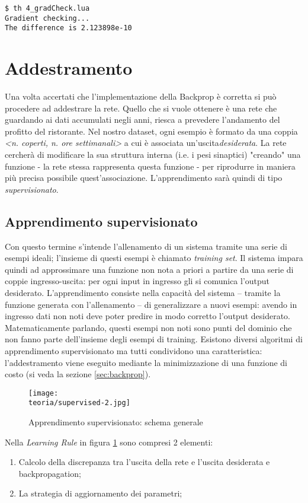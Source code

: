 \begin{lstlisting}
$ th 4_gradCheck.lua 
Gradient checking...	
The difference is 2.123898e-10	
\end{lstlisting}

\section{Addestramento}
\label{ref:training}
Una volta accertati che l'implementazione della Backprop è corretta si può procedere ad addestrare la rete. Quello che si vuole ottenere è una rete che guardando ai dati accumulati negli anni, riesca a prevedere l'andamento del profitto del ristorante. Nel nostro dataset, ogni esempio è formato da una coppia \emph{<n. coperti, n. ore settimanali>} a cui è associata un'uscita\emph{desiderata}. La rete cercherà di modificare la sua struttura interna (i.e. i pesi sinaptici) "creando" una funzione - la rete stessa rappresenta questa funzione - per riprodurre in maniera più precisa possibile quest'associazione. L'apprendimento sarà quindi di tipo \emph{supervisionato}.
\subsection{Apprendimento supervisionato}
Con questo termine s'intende l'allenamento di un sistema tramite una serie di esempi ideali; l'insieme di questi esempi è chiamato
\emph{training set}. Il sistema impara quindi ad approssimare una funzione non nota a priori a partire da una serie di coppie ingresso-uscita: per ogni input in ingresso gli si comunica l'output desiderato.
L'apprendimento consiste nella capacità del sistema – tramite la funzione generata con l'allenamento – di generalizzare a nuovi esempi: avendo in ingresso dati non noti deve poter predire in modo corretto l'output desiderato.
Matematicamente parlando, questi esempi non noti sono punti del dominio che non fanno parte dell'insieme degli esempi di training.
Esistono diversi algoritmi di apprendimento supervisionato ma tutti condividono una caratteristica: l'addestramento
viene eseguito mediante la minimizzazione di una funzione di costo (si veda la sezione \ref{sec:backprop}).
\begin{figure}[h!]
 \centering
 \texttt{[image: \\teoria/supervised-2.jpg]}
 \caption{Apprendimento supervisionato: schema generale}
 \label{fig:supervised}
\end{figure}
Nella \emph{Learning Rule} in figura \ref{fig:supervised} sono compresi 2 elementi: 
\begin{enumerate}
\item Calcolo della discrepanza tra l'uscita della rete e l'uscita desiderata e backpropagation;
\item La strategia di aggiornamento dei parametri;
\end{enumerate}

